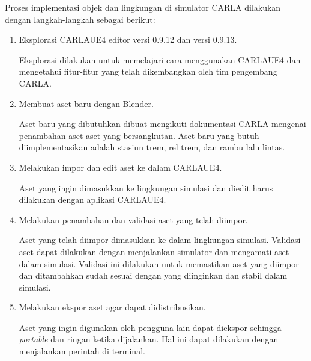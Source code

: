 Proses implementasi objek dan lingkungan di simulator CARLA dilakukan dengan
langkah-langkah sebagai berikut:


\begin{enumerate}

	\item Eksplorasi CARLAUE4 editor versi 0.9.12 dan versi 0.9.13.

	Eksplorasi dilakukan untuk memelajari cara menggunakan CARLAUE4 dan
	mengetahui fitur-fitur yang telah dikembangkan oleh tim pengembang CARLA.

	\item Membuat aset baru dengan Blender.

	Aset baru yang dibutuhkan dibuat mengikuti dokumentasi CARLA mengenai
	penambahan aset-aset yang bersangkutan. Aset baru yang butuh
	diimplementasikan adalah stasiun trem, rel trem, dan rambu lalu lintas.

	\item Melakukan impor dan edit aset ke dalam CARLAUE4.

	Aset yang ingin dimasukkan ke lingkungan simulasi dan diedit harus dilakukan
	dengan aplikasi CARLAUE4.




	\item Melakukan penambahan dan validasi aset yang telah diimpor.

	Aset yang telah diimpor dimasukkan ke dalam lingkungan simulasi. Validasi
	aset dapat dilakukan dengan menjalankan simulator dan mengamati aset dalam
	simulasi. Validasi ini dilakukan untuk memastikan aset yang diimpor dan
	ditambahkan sudah sesuai dengan yang diinginkan dan stabil dalam simulasi.

	\item Melakukan ekspor aset agar dapat didistribusikan.

	Aset yang ingin digunakan oleh pengguna lain dapat diekspor sehingga
	\textit{portable} dan ringan ketika dijalankan. Hal ini dapat dilakukan
	dengan menjalankan perintah di terminal.

\end{enumerate}
